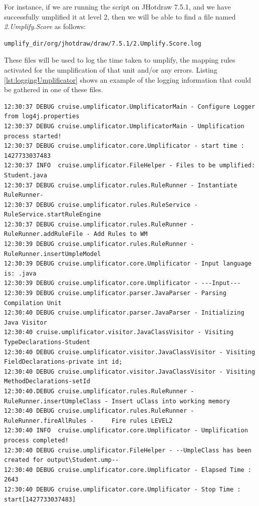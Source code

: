 For instance, if we are running the script on JHotdraw 7.5.1, and we have successfully umplified it at level 2, then we will be able to find a file named \textit{2.Umplify.Score} as follows:

\vspace{\baselineskip}
\begin{lstlisting}[style=umplePlain]
   umplify_dir/org/jhotdraw/draw/7.5.1/2.Umplify.Score.log
\end{lstlisting}


These files will be used to log the time taken to umplify, the mapping rules activated for the umplification of that unit and/or any errors. Listing \ref{lst:loggingUmplificator} shows an example of the logging information that could be gathered in one of these files.
\begin{lstlisting}[style=umplePlain, caption= Logging Information sample gathered by the Umplificator, label=lst:loggingUmplificator]
12:30:37 DEBUG cruise.umplificator.UmplificatorMain - Configure Logger from log4j.properties
12:30:37 DEBUG cruise.umplificator.UmplificatorMain - Umplification process started!
12:30:37 DEBUG cruise.umplificator.core.Umplificator - start time : 1427733037483
12:30:37 INFO  cruise.umplificator.FileHelper - Files to be umplified: Student.java
12:30:37 DEBUG cruise.umplificator.rules.RuleRunner - Instantiate RuleRunner- 
12:30:37 DEBUG cruise.umplificator.rules.RuleService - RuleService.startRuleEngine
12:30:37 DEBUG cruise.umplificator.rules.RuleRunner - RuleRunner.addRuleFile - Add Rules to WM
12:30:39 DEBUG cruise.umplificator.rules.RuleRunner - RuleRunner.insertUmpleModel 
12:30:39 DEBUG cruise.umplificator.core.Umplificator - Input language is: .java
12:30:39 DEBUG cruise.umplificator.core.Umplificator - ---Input---
12:30:39 DEBUG cruise.umplificator.parser.JavaParser - Parsing Compilation Unit
12:30:40 DEBUG cruise.umplificator.parser.JavaParser - Initializing Java Visitor 
12:30:40 cruise.umplificator.visitor.JavaClassVisitor - Visiting TypeDeclarations-Student
12:30:40 DEBUG cruise.umplificator.visitor.JavaClassVisitor - Visiting FieldDeclarations-private int id;
12:30:40 DEBUG cruise.umplificator.visitor.JavaClassVisitor - Visiting MethodDeclarations-setId
12:30:40.DEBUG cruise.umplificator.rules.RuleRunner - RuleRunner.insertUmpleClass - Insert uClass into working memory
12:30:40 DEBUG cruise.umplificator.rules.RuleRunner - RuleRunner.fireAllRules -     Fire rules LEVEL2
12:30:40 INFO  cruise.umplificator.core.Umplificator - Umplification process completed!
12:30:40 DEBUG cruise.umplificator.FileHelper - --UmpleClass has been created for output\Student.ump--
12:30:40 DEBUG cruise.umplificator.core.Umplificator - Elapsed Time : 2643
12:30:40 DEBUG cruise.umplificator.core.Umplificator - Stop Time : start[1427733037483]
\end{lstlisting}

